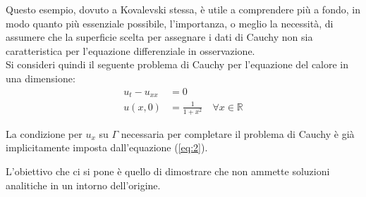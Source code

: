 \begin{example}
Questo esempio, dovuto a Kovalevski stessa, è utile a comprendere più a fondo, in modo quanto più essenziale possibile, 
l'importanza, o meglio la necessità, di assumere che la superficie scelta per assegnare i dati di Cauchy non sia caratteristica 
per l'equazione differenziale in osservazione.\\ 
Si consideri quindi il seguente problema di Cauchy per l'equazione del calore in una dimensione:
\begin{align} 
\label{eq:1}
u_t-u_{xx}&=0\\ 
\label{eq:2}
u(x,0)&=\frac{1}{1+x^2} \quad \forall x \in \mathbb{R}
\end{align}
\begin{remark}
La condizione per $u_x$ su $\Gamma$ necessaria per completare il problema di Cauchy è già implicitamente imposta dall'equazione (\ref{eq:2}).
\end{remark}
L'obiettivo che ci si pone è quello di dimostrare che non ammette soluzioni analitiche in un intorno dell'origine.


\end{example}
